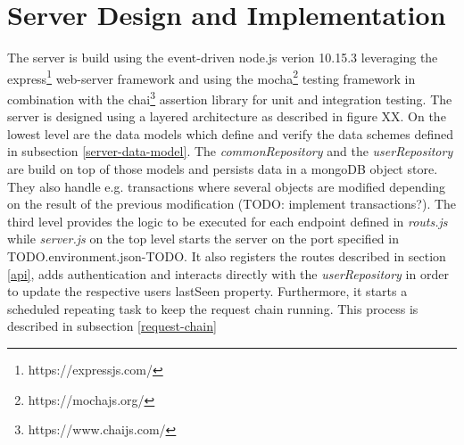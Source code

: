 \section{Server Design and Implementation}\label{server}
The server is build using the event-driven node.js verion 10.15.3 leveraging the express\footnote{https://expressjs.com/} web-server framework and using the mocha\footnote{https://mochajs.org/} testing framework in combination with the chai\footnote{https://www.chaijs.com/} assertion library for unit and integration testing. The server is designed using a layered architecture as described in figure XX. On the lowest level are the data models which define and verify the data schemes defined in subsection \ref{server-data-model}. The \textit{commonRepository} and the \textit{userRepository} are build on top of those models and persists data in a mongoDB object store. They also handle e.g. transactions where several objects are modified depending on the result of the previous modification (TODO: implement transactions?). The third level provides the logic to be executed for each endpoint defined in \textit{routs.js} while \textit{server.js} on the top level starts the server on the port specified in TODO.environment.json-TODO. It also registers the routes described in section \ref{api}, adds authentication and interacts directly with the \textit{userRepository} in order to update the respective users lastSeen property. Furthermore, it starts a scheduled repeating task to keep the request chain running. This process is described in subsection \ref{request-chain}

